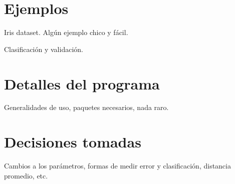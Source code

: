 \section{Ejemplos}

Iris dataset. Algún ejemplo chico y fácil.

Clasificación y validación.

\section{Detalles del programa}

Generalidades de uso, paquetes necesarios, nada raro.

\section{Decisiones tomadas}

Cambios a los parámetros, formas de medir error y clasificación, distancia promedio, etc.